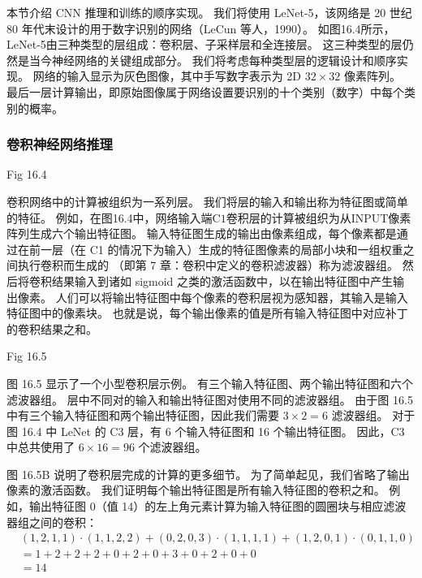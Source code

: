 本节介绍 CNN 推理和训练的顺序实现。 
我们将使用 LeNet-5，该网络是 20 世纪 80 年代末设计的用于数字识别的网络（LeCun 等人，1990）。 
如图16.4所示，LeNet-5由三种类型的层组成：卷积层、子采样层和全连接层。 这三种类型的层仍然是当今神经网络的关键组成部分。 
我们将考虑每种类型层的逻辑设计和顺序实现。 网络的输入显示为灰色图像，其中手写数字表示为 2D $32 \times 32$ 像素阵列。 
最后一层计算输出，即原始图像属于网络设置要识别的十个类别（数字）中每个类别的概率。

\subsubsection{卷积神经网络推理}
{\color{red} Fig 16.4}

卷积网络中的计算被组织为一系列层。 我们将层的输入和输出称为特征图或简单的特征。 
例如，在图16.4中，网络输入端$\mathrm{C} 1$卷积层的计算被组织为从INPUT像素阵列生成六个输出特征图。 
输入特征图生成的输出由像素组成，每个像素都是通过在前一层（在 C1 的情况下为输入）生成的特征图像素的局部小块和一组权重之间执行卷积而生成的 （即第 7 章：卷积中定义的卷积滤波器）称为滤波器组。 
然后将卷积结果输入到诸如 sigmoid 之类的激活函数中，以在输出特征图中产生输出像素。 
人们可以将输出特征图中每个像素的卷积层视为感知器，其输入是输入特征图中的像素块。 
也就是说，每个输出像素的值是所有输入特征图中对应补丁的卷积结果之和。

{\color{red} Fig 16.5}

图 16.5 显示了一个小型卷积层示例。 有三个输入特征图、两个输出特征图和六个滤波器组。 
层中不同对的输入和输出特征图对使用不同的滤波器组。 
由于图 16.5 中有三个输入特征图和两个输出特征图，因此我们需要 $3 \times 2=6$ 滤波器组。 
对于图 16.4 中 LeNet 的 C3 层，有 6 个输入特征图和 16 个输出特征图。 
因此，$\mathrm{C} 3$ 中总共使用了 $6 \times 16=96$ 个滤波器组。

图 16.5B 说明了卷积层完成的计算的更多细节。 为了简单起见，我们省略了输出像素的激活函数。 
我们证明每个输出特征图是所有输入特征图的卷积之和。 
例如，输出特征图 0（值 14）的左上角元素计算为输入特征图的圆圈块与相应滤波器组之间的卷积：
$$
\begin{aligned}
& (1,2,1,1) \cdot(1,1,2,2)+(0,2,0,3) \cdot(1,1,1,1)+(1,2,0, 1) \cdot(0,1,1,0) \\
& =1+2+2+2+0+2+0+3+0+2+0+0 \\
&=14
\end{aligned}
$$

